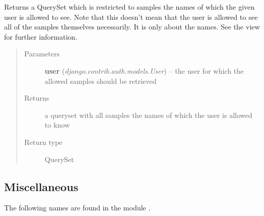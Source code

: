 \documentclass[a4paper,11pt,english]{sphinxmanual}
\begin{document}
\begin{fulllineitems}
\label{programming/utilities:samples.utils.views.restricted_samples_query}
Returns a QuerySet which is restricted to samples the names of which the
given user is allowed to see.  Note that this doesn't mean that the user is
allowed to see all of the samples themselves necessarily.  It is only about
the names.  See the  view for further
information.
\begin{quote}\begin{description}
\item[{Parameters}] \leavevmode
\textbf{user} (\emph{django.contrib.auth.models.User}) -- the user for which the allowed samples should be retrieved

\item[{Returns}] \leavevmode
a queryset with all samples the names of which the user is allowed to
know

\item[{Return type}] \leavevmode
QuerySet

\end{description}\end{quote}

\end{fulllineitems}



\subsection{Miscellaneous}
\label{programming/utilities:miscellaneous}
The following names are found in the module .
\end{document}

